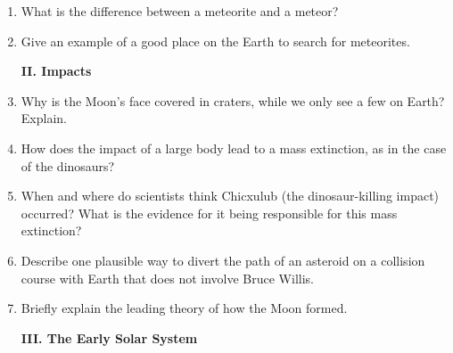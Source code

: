 \documentclass[10pt]{article}%
\begin{document}
\begin{flushleft}
\begin{enumerate}
\item What is the difference between a meteorite and a meteor? 

\vspace{0.3cm}

\item Give an example of a good place on the Earth to search for meteorites.

\vspace{0.3cm}

\begin{center}
\textbf{II. Impacts}
\end{center}

\vspace{0.3cm}

\vspace{0.3cm}

\item Why is the Moon's face covered in craters, while we only see a few on Earth? 
Explain.

\vspace{0.3cm}

\item How does the impact of a large body lead to a mass extinction, as in the
case of the dinosaurs?  

\vspace{0.3cm}

\item When and where do scientists think Chicxulub (the dinosaur-killing impact) 
occurred?  What is the evidence for it being responsible for this mass
extinction?

\vspace{0.3cm}

\item Describe one plausible way to divert the path of an asteroid on a collision
course with Earth that does not involve Bruce Willis.

\vspace{0.3cm}

\item Briefly explain the leading theory of how the Moon formed. 

\vspace{0.3cm}


\begin{center}
\textbf{III. The Early Solar System}
\end{center}

\vspace{0.3cm}


\end{enumerate}
\end{flushleft}
\end{document}
